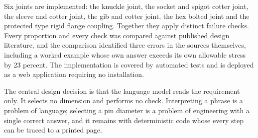 \documentclass[12pt,a4paper]{report}
\begin{document}
\hspace{10mm}Six joints are implemented: the knuckle joint, the socket and spigot cotter joint, the
sleeve and cotter joint, the gib and cotter joint, the hex bolted joint and the protected type rigid
flange coupling. Together they apply \NChecks{} distinct failure checks. Every proportion and every
check was compared against published design literature, and the comparison identified three errors
in the sources themselves, including a worked example whose own answer exceeds its own allowable
stress by 23 percent. The implementation is covered by \NTests{} automated tests and is deployed as
a web application requiring no installation.

\hspace{10mm}The central design decision is that the language model reads the requirement only. It
selects no dimension and performs no check. Interpreting a phrase is a problem of language;
selecting a pin diameter is a problem of engineering with a single correct answer, and it remains
with deterministic code whose every step can be traced to a printed page.
\end{document}
